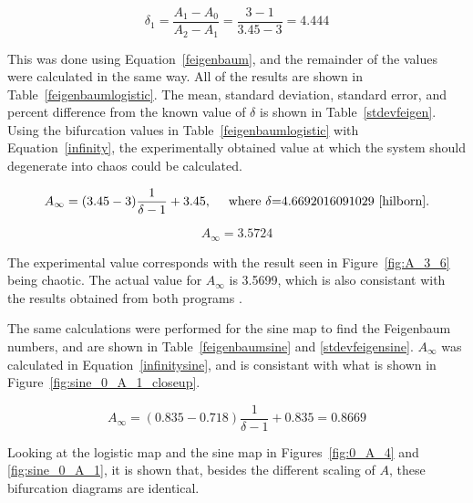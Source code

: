\documentclass[12pt]{report}
\theoremstyle{definition}
\begin{document}
\begin{equation}
\delta_1 = \frac{A_1-A_0}{A_2-A_1}= \frac{3-1}{3.45-3}=4.444
\label{delta1}
\end{equation}

This was done using Equation~\ref{feigenbaum},  and the remainder of the values were calculated in the same way. All of the results are shown in Table~\ref{feigenbaumlogistic}. The mean, standard deviation, standard error, and percent difference from the known value of $\delta$ is shown in Table~\ref{stdevfeigen}. Using the bifurcation values in Table~\ref{feigenbaumlogistic} with Equation~\ref{infinity}, the experimentally obtained value at which the system should degenerate into chaos could be calculated.

\begin{equation}
A_\infty = (3.45-3)\frac{1}{\delta-1}+3.45, \quad \text{ where $\delta$=4.6692016091029 \cite{hilborn}.} 
\label{infinitylog}
\end{equation}

\begin{equation}
A_\infty =  3.5724
\label{infinitylog2}
\end{equation}

The experimental value corresponds with the result seen in Figure~\ref{fig:A_3_6} being chaotic. The actual value for $A_\infty$ is 3.5699, which is also consistant with the results obtained from both programs \cite{hilborn}. 

The same calculations were performed for the sine map to find the Feigenbaum numbers, and are shown in Table~\ref{feigenbaumsine} and \ref{stdevfeigensine}. $A_\infty$ was calculated in Equation~\ref{infinitysine}, and is consistant with what is shown in Figure~\ref{fig:sine_0_A_1_closeup}.

\begin{equation}
A_\infty = (0.835-0.718)\frac{1}{\delta-1}+0.835=0.8669
\label{infinitysine}
\end{equation}

Looking at the logistic map and the sine map in Figures~\ref{fig:0_A_4} and \ref{fig:sine_0_A_1}, it is shown that, besides the different scaling of $A$, these bifurcation diagrams are identical. 
\end{document}
